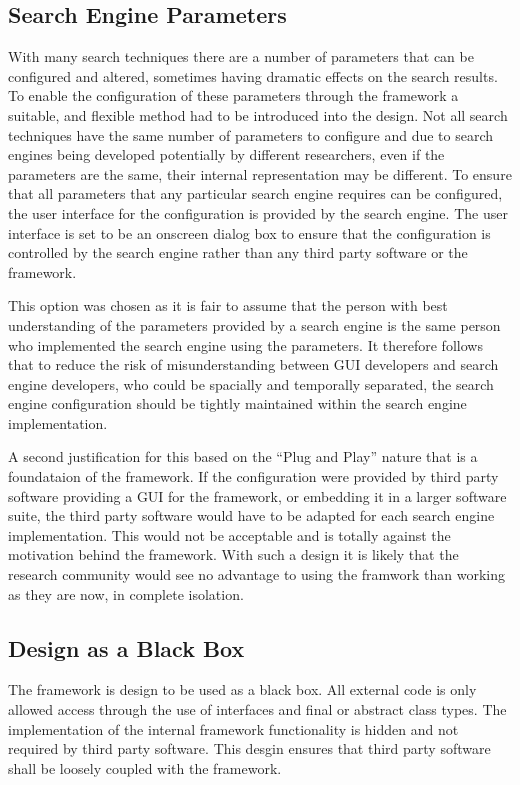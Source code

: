 \subsection{Search Engine Parameters}
With many search techniques there are a number of parameters that can be configured and altered, sometimes having dramatic effects on the search results.
To enable the configuration of these parameters through the framework a suitable, and flexible method had to be introduced into the design.
Not all search techniques have the same number of parameters to configure and due to search engines being developed potentially by different researchers, even if the parameters are the same, their internal representation may be different.
To ensure that all parameters that any particular search engine requires can be configured, the user interface for the configuration is provided by the search engine.
The user interface is set to be an onscreen dialog box to ensure that the configuration is controlled by the search engine rather than any third party software or the framework.

This option was chosen as it is fair to assume that the person with best understanding of the parameters provided by a search engine is the same person who implemented the search engine using the parameters.
It therefore follows that to reduce the risk of misunderstanding between GUI developers and search engine developers, who could be spacially and temporally separated, the search engine configuration should be tightly maintained within the search engine implementation.

A second justification for this based on the ``Plug and Play'' nature that is a foundataion of the framework.
If the configuration were provided by third party software providing a GUI for the framework, or embedding it in a larger software suite, the third party software would have to be adapted for each search engine implementation.
This would not be acceptable and is totally against the motivation behind the framework.
With such a design it is likely that the research community would see no advantage to using the framwork than working as they are now, in complete isolation.


\subsection{Design as a Black Box}
The framework is design to be used as a black box.
All external code is only allowed access through the use of interfaces and final or abstract class types.
The implementation of the internal framework functionality is hidden and not required by third party software.
This desgin ensures that third party software shall be loosely coupled with the framework.

